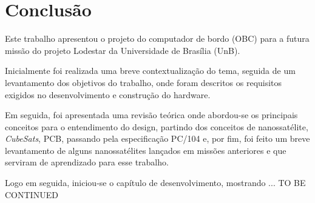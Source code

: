 \chapter{Conclusão} \label{conclusao}

Este trabalho apresentou o projeto do computador de bordo (OBC) para a futura missão do projeto Lodestar da Universidade de Brasília (UnB).

Inicialmente foi realizada uma breve contextualização do tema, seguida de um levantamento dos objetivos do trabalho, onde foram descritos os requisitos exigidos no desenvolvimento e construção do hardware. 

Em seguida, foi apresentada uma revisão teórica onde abordou-se os principais conceitos para o entendimento do design, partindo dos conceitos de nanossatélite, \textit{CubeSats}, PCB, passando pela especificação PC/104 e, por fim, foi feito um breve levantamento de alguns nanossatélites lançados em missões anteriores e que serviram de aprendizado para esse trabalho.

Logo em seguida, iniciou-se o capítulo de desenvolvimento, mostrando ... TO BE CONTINUED



\noindent
\begin{minipage}{\linewidth}
\label{tcc2_gantt_fig}
\end{minipage}